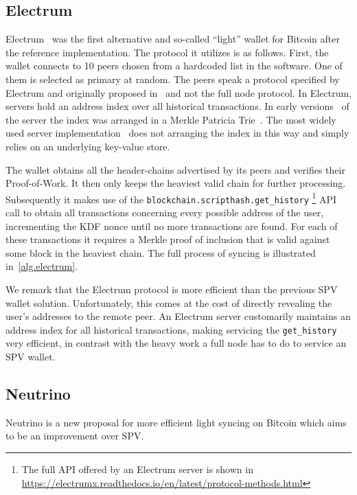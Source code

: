 
\subsection{Electrum}
Electrum~\cite{electrum} was the first alternative and so-called ``light'' wallet for Bitcoin after the reference implementation.
The protocol it utilizes is as follows. First, the wallet connects to 10 peers chosen from a hardcoded list in the software. One of them is selected as primary at random. The peers speak a protocol specified by Electrum and originally proposed in~\cite{stratum} and not the full node protocol.
In Electrum, servers hold an address index over all historical transactions. In early versions~\cite{electrumserver} of the server the index was arranged in a Merkle Patricia Trie~\cite{ultimate}. The most widely used server implementation~\cite{electrumserverrust} does not arranging the index in this way and simply relies on an underlying key-value store.

The wallet obtains all the header-chains advertised by its peers and verifies their Proof-of-Work. It then only keeps the heaviest valid chain for further processing. Subsequently it makes use of the \texttt{block\-chain.\allowbreak script\-hash.\allowbreak get\_history}
\footnote{The full API offered by an Electrum server is shown in \url{https://electrumx.readthedocs.io/en/latest/protocol-methods.html}}
API call to obtain all transactions concerning every possible address of the user, incrementing the KDF nonce until no more transactions are found. For each of these transactions it requires a Merkle proof of inclusion that is valid against some block in the heaviest chain. The full process of syncing is illustrated in~\cref{alg.electrum}.

We remark that the Electrum protocol is more efficient than the previous SPV wallet solution. Unfortunately, this comes at the cost of directly revealing the user's addresses to the remote peer. An Electrum server customarily maintains an address index for all historical transactions, making servicing the \texttt{get\_history} very efficient, in contrast with the heavy work a full node has to do to service an SPV wallet.



\subsection{Neutrino}
Neutrino is a new proposal for more efficient light syncing on Bitcoin which aims to be an improvement over SPV.

